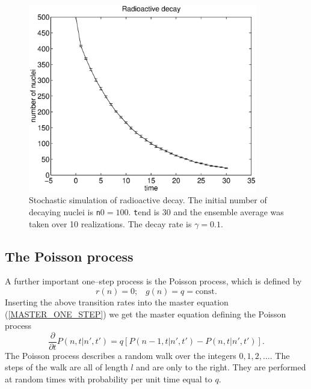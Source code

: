 \begin{figure}
\label{F_OS_DECAY}
\includegraphics[width=10cm]{./Figures/f_os_decay.eps}
\caption{Stochastic simulation of radioactive decay. The initial
  number of decaying nuclei is {\texttt n0}$= 100$. {\texttt tend}
is 30 and the ensemble average was taken over 10 realizations.
The decay rate is $\gamma=0.1$.}
\end{figure}  

\subsection{The Poisson process}
A further important one--step process is the Poisson process, which
is defined by
\begin{equation}
r(n) = 0; \;\;\; g(n) = q = \text{const}.
\end{equation}
Inserting the above transition rates into the master equation
(\ref{MASTER_ONE_STEP}) we get the master equation defining
the Poisson process
\begin{equation}
\label{MASTER_POISSON}
\frac{\partial}{\partial t} P(n,t|n',t') =
  q [ P(n-1,t|n',t') - P(n,t|n',t')].
\end{equation}
The Poisson process describes a random walk over the integers
$0,1,2,\ldots$. The steps of the walk are all of length $l$ and are 
only to the right. They are performed at random times with 
probability per unit time equal to $q$.

